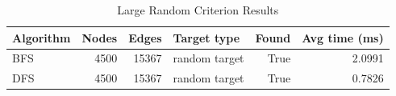 \begin{table}[H]
\centering
\caption{Large Random Criterion Results}
\begin{tabular}{lrrlrr}
\toprule
Algorithm & Nodes & Edges & Target type & Found & Avg time (ms)\\
\midrule
BFS & 4500 & 15367 & random target & True & 2.0991\\
DFS & 4500 & 15367 & random target & True & 0.7826\\
\bottomrule
\end{tabular}
\end{table}
